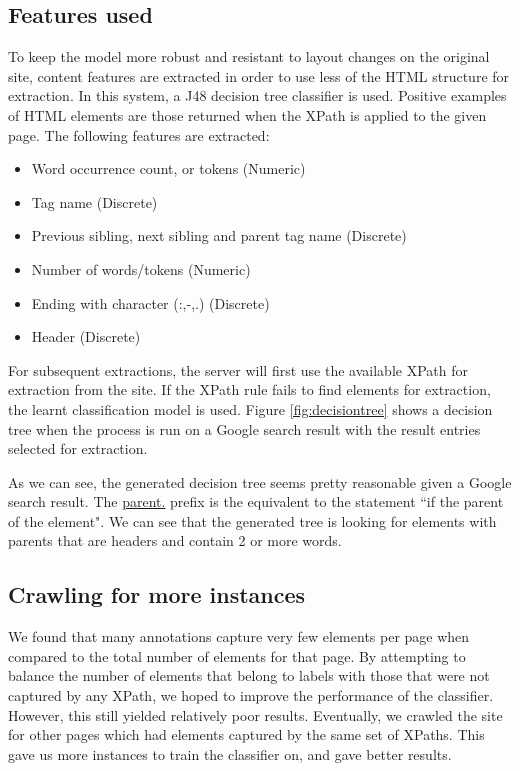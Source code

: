 \subsection{Features used}
To keep the model more robust and resistant to layout changes on the original site, content features are extracted in order to use less of the HTML structure for extraction. In this system, a J48 decision tree classifier is used. Positive examples of HTML elements are those returned when the XPath is applied to the given page. The following features are extracted:

	\begin{itemize}
		\item Word occurrence count, or tokens (Numeric)
		\item Tag name (Discrete)
		\item Previous sibling, next sibling and parent tag name (Discrete)
		\item Number of words/tokens (Numeric)
		\item Ending with character (:,-,.) (Discrete)
		\item Header (Discrete)
	\end{itemize}
	

	
	
	For subsequent extractions, the server will first use the available XPath for extraction from the site. If the XPath rule fails to find elements for extraction, the learnt classification model is used. Figure \ref{fig:decisiontree} shows a decision tree when the process is run on a Google search result with the result entries selected for extraction.
	
	
	As we can see, the generated decision tree seems pretty reasonable given a Google search result. The \url{parent.}	prefix is the equivalent to the statement ``if the parent of the element". We can see that the generated tree is looking for elements with parents that are headers and contain 2 or more words.
	
\subsection{Crawling for more instances}
	We found that many annotations capture very few elements per page when compared to the total number of elements for that page. By attempting to balance the number of elements that belong to labels with those that were not captured by any XPath, we hoped to improve the performance of the classifier. However, this still yielded relatively poor results. Eventually, we crawled the site for other pages which had elements captured by the same set of XPaths. This gave us more instances to train the classifier on, and gave better results.
	
